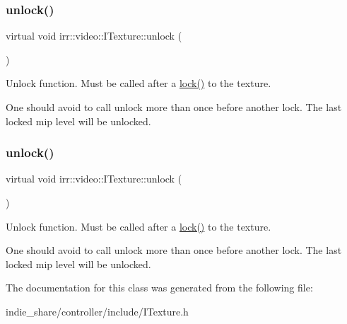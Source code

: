 \subsubsection{\texorpdfstring{unlock()}{unlock()}\hspace{0.1cm}{\footnotesize\ttfamily [1/2]}}
{\footnotesize\ttfamily virtual void irr\+::video\+::\+I\+Texture\+::unlock (\begin{DoxyParamCaption}{ }\end{DoxyParamCaption})\hspace{0.3cm}{\ttfamily [pure virtual]}}



Unlock function. Must be called after a \hyperlink{classirr_1_1video_1_1ITexture_aa09ee89973a645ebdd2bd61ed859df38}{lock()} to the texture. 

One should avoid to call unlock more than once before another lock. The last locked mip level will be unlocked. \mbox{\label{classirr_1_1video_1_1ITexture_a15b9a25aa18528ade37a492bd7b20a10}} 
\subsubsection{\texorpdfstring{unlock()}{unlock()}\hspace{0.1cm}{\footnotesize\ttfamily [2/2]}}
{\footnotesize\ttfamily virtual void irr\+::video\+::\+I\+Texture\+::unlock (\begin{DoxyParamCaption}{ }\end{DoxyParamCaption})\hspace{0.3cm}{\ttfamily [pure virtual]}}



Unlock function. Must be called after a \hyperlink{classirr_1_1video_1_1ITexture_aa09ee89973a645ebdd2bd61ed859df38}{lock()} to the texture. 

One should avoid to call unlock more than once before another lock. The last locked mip level will be unlocked. 

The documentation for this class was generated from the following file\+:\begin{DoxyCompactItemize}
\item 
indie\+\_\+share/controller/include/I\+Texture.\+h\end{DoxyCompactItemize}
